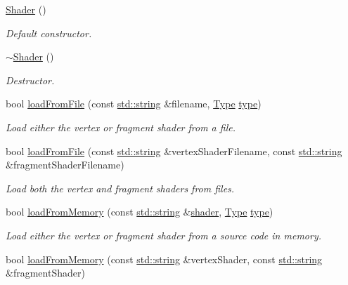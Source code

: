 \begin{DoxyCompactItemize}
\item 
\hyperlink{classsf_1_1_shader_a1d7f28f26b4122959fcafec871c2c3c5}{Shader} ()
\begin{DoxyCompactList}\small\item\em Default constructor. \end{DoxyCompactList}\item 
\hyperlink{classsf_1_1_shader_a4bac6cc8b046ecd8fb967c145a2380e6}{$\sim$\-Shader} ()
\begin{DoxyCompactList}\small\item\em Destructor. \end{DoxyCompactList}\item 
bool \hyperlink{classsf_1_1_shader_a053a5632848ebaca2fcd8ba29abe9e6e}{load\-From\-File} (const \hyperlink{gl3_8h_ac83513893df92266f79a515488701770}{std\-::string} \&filename, \hyperlink{classsf_1_1_shader_afaa1aa65e5de37b74d047da9def9f9b3}{Type} \hyperlink{gl3_8h_a984aabed544368e7fe0e566d7cf014a7}{type})
\begin{DoxyCompactList}\small\item\em Load either the vertex or fragment shader from a file. \end{DoxyCompactList}\item 
bool \hyperlink{classsf_1_1_shader_ac9d7289966fcef562eeb92271c03e3dc}{load\-From\-File} (const \hyperlink{gl3_8h_ac83513893df92266f79a515488701770}{std\-::string} \&vertex\-Shader\-Filename, const \hyperlink{gl3_8h_ac83513893df92266f79a515488701770}{std\-::string} \&fragment\-Shader\-Filename)
\begin{DoxyCompactList}\small\item\em Load both the vertex and fragment shaders from files. \end{DoxyCompactList}\item 
bool \hyperlink{classsf_1_1_shader_ac92d46bf71dff2d791117e4e472148aa}{load\-From\-Memory} (const \hyperlink{gl3_8h_ac83513893df92266f79a515488701770}{std\-::string} \&\hyperlink{gl3_8h_a57b2a96adb1d51204909a82d861e395e}{shader}, \hyperlink{classsf_1_1_shader_afaa1aa65e5de37b74d047da9def9f9b3}{Type} \hyperlink{gl3_8h_a984aabed544368e7fe0e566d7cf014a7}{type})
\begin{DoxyCompactList}\small\item\em Load either the vertex or fragment shader from a source code in memory. \end{DoxyCompactList}\item 
bool \hyperlink{classsf_1_1_shader_ae34e94070d7547a890166b7993658a9b}{load\-From\-Memory} (const \hyperlink{gl3_8h_ac83513893df92266f79a515488701770}{std\-::string} \&vertex\-Shader, const \hyperlink{gl3_8h_ac83513893df92266f79a515488701770}{std\-::string} \&fragment\-Shader)

\end{DoxyCompactItemize}
